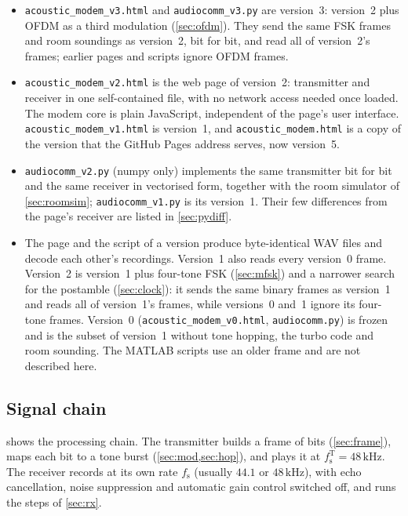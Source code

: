 \documentclass[11pt,a4paper]{article}
\newcommand{\kHz}{\,\mathrm{kHz}}
\newcommand{\code}[1]{\texttt{#1}}
\newcommand{\fsT}{f_{\mathrm{s}}^{\mathrm{T}}}
\newcommand{\fs}{f_{\mathrm{s}}}
\theoremstyle{remark}
\begin{document}
\begin{itemize}
\item \code{acoustic\_modem\_v3.html} and \code{audiocomm\_v3.py} are version~3: version~2 plus OFDM as a third modulation (\cref{sec:ofdm}). They send the same FSK frames and room soundings as version~2, bit for bit, and read all of version~2's frames; earlier pages and scripts ignore OFDM frames.
\item \code{acoustic\_modem\_v2.html} is the web page of version~2: transmitter and receiver in one self-contained file, with no network access needed once loaded. The modem core is plain JavaScript, independent of the page's user interface. \code{acoustic\_modem\_v1.html} is version~1, and \code{acoustic\_modem.html} is a copy of the version that the GitHub Pages address serves, now version~5.
\item \code{audiocomm\_v2.py} (numpy only) implements the same transmitter bit for bit and the same receiver in vectorised form, together with the room simulator of \cref{sec:roomsim}; \code{audiocomm\_v1.py} is its version~1. Their few differences from the page's receiver are listed in \cref{sec:pydiff}.
\item The page and the script of a version produce byte-identical WAV files and decode each other's recordings. Version~1 also reads every version~0 frame. Version~2 is version~1 plus four-tone FSK (\cref{sec:mfsk}) and a narrower search for the postamble (\cref{sec:clock}): it sends the same binary frames as version~1 and reads all of version~1's frames, while versions~0 and~1 ignore its four-tone frames. Version~0 (\code{acoustic\_modem\_v0.html}, \code{audiocomm.py}) is frozen and is the subset of version~1 without tone hopping, the turbo code and room sounding. The MATLAB scripts use an older frame and are not described here.
\end{itemize}

\subsection{Signal chain}
 shows the processing chain.
The transmitter builds a frame of bits (\cref{sec:frame}), maps each bit to a tone burst (\cref{sec:mod,sec:hop}), and plays it at $\fsT = 48\kHz$.
The receiver records at its own rate $\fs$ (usually $44.1$ or $48\kHz$), with echo cancellation, noise suppression and automatic gain control switched off, and runs the steps of \cref{sec:rx}.
\end{document}
